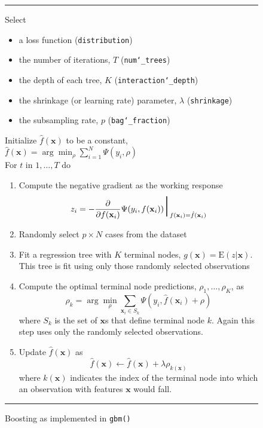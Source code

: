 \documentclass{article}
\newcommand{\EV}{\mathrm{E}}
\newcommand{\aRule}{\begin{center} \rule{5in}{1mm} \end{center}}
\begin{document}
\begin{figure}
\aRule
Select
\begin{itemize}
\item a loss function (\texttt{distribution})
\item the number of iterations, $T$ (\texttt{num\char`_trees})
\item the depth of each tree, $K$ (\texttt{interaction\char`_depth})
\item the shrinkage (or learning rate) parameter, $\lambda$
  (\texttt{shrinkage})
\item the subsampling rate, $p$ (\texttt{bag\char`_fraction})
\end{itemize}
Initialize $\hat f(\mathbf{x})$ to be a constant, $\hat f(\mathbf{x}) = \arg \min_{\rho} \sum_{i=1}^N \Psi(y_i,\rho)$ \\
For $t$ in $1,\ldots,T$ do
\begin{enumerate}
\item Compute the negative gradient as the working response
    \begin{equation}
    z_i = -\frac{\partial}{\partial f(\mathbf{x}_i)} \Psi(y_i,f(\mathbf{x}_i)) \mbox{\Huge $|$}_{f(\mathbf{x}_i)=\hat f(\mathbf{x}_i)}
    \end{equation}
\item Randomly select $p\times N$ cases from the dataset
\item Fit a regression tree with $K$ terminal nodes,
  $g(\mathbf{x})=\EV(z|\mathbf{x})$. This tree is fit using only those
  randomly selected observations
\item Compute the optimal terminal node predictions, $\rho_1,\ldots,\rho_K$, as
    \begin{equation}
    \rho_k = \arg \min_{\rho} \sum_{\mathbf{x}_i\in S_k} \Psi(y_i,\hat f(\mathbf{x}_i)+\rho)
    \end{equation}
    where $S_k$ is the set of $\mathbf{x}$s that define terminal node
    $k$. Again this step uses only the randomly selected observations.
\item Update $\hat f(\mathbf{x})$ as
    \begin{equation}
    \hat f(\mathbf{x}) \leftarrow \hat f(\mathbf{x}) + \lambda\rho_{k(\mathbf{x})}
    \end{equation}
    where $k(\mathbf{x})$ indicates the index of the terminal node
    into which an observation with features $\mathbf{x}$ would fall.
\end{enumerate}
\aRule
\caption{Boosting as implemented in \texttt{gbm()}}
\label{fig:gbm}
\end{figure}
\end{document}
